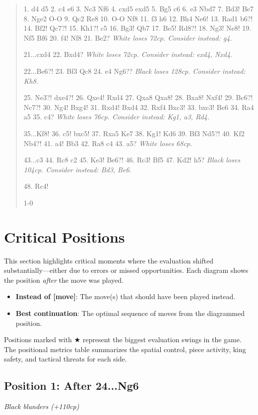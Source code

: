 \documentclass[11pt]{book}
\begin{document}
\begin{quote}
1. d4 d5
2. c4 e6
3. Nc3 Nf6
4. cxd5 exd5
5. Bg5 c6
6. e3 Nbd7
7. Bd3! Be7
8. Nge2 O-O
9. Qc2 Re8
10. O-O Nf8
11. f3 h6
12. Bh4 Ne6!
13. Rad1 b6?!
14. Bf2! Qc7?!
15. Kh1?! c5
16. Bg3! Qb7
17. Be5! Rd8?!
18. Ng3! Ne8!
19. Nf5 Bf6
20. f4! Nf8
21. Be2?
\textit{White loses 72cp. Consider instead: g4.}

21...cxd4
22. Bxd4?
\textit{White loses 72cp. Consider instead: exd4, Nxd4.}

22...Be6?!
23. Bf3 Qc8
24. e4 Ng6??
\textit{Black loses 128cp. Consider instead: Kh8.}

25. Ne3?! dxe4?!
26. Qxe4! Rxd4
27. Qxa8 Qxa8!
28. Bxa8! Nxf4!
29. Bc6?! Nc7?!
30. Ng4! Bxg4!
31. Rxd4! Bxd4
32. Rxf4 Bxc3!
33. bxc3! Be6
34. Ra4 a5
35. c4?
\textit{White loses 76cp. Consider instead: Kg1, a3, Rd4.}

35...Kf8!
36. c5! bxc5!
37. Rxa5 Ke7
38. Kg1! Kd6
39. Bf3 Nd5?!
40. Kf2 Nb4?!
41. a4! Bb3
42. Ra8 c4
43. a5?
\textit{White loses 68cp.}

43...c3
44. Rc8 c2
45. Ke3! Be6?!
46. Rc3! Bf5
47. Kd2! h5?
\textit{Black loses 104cp. Consider instead: Bd3, Be6.}

48. Rc4!

1-0
\end{quote}

\section{Critical Positions}

This section highlights critical moments where the evaluation shifted substantially---either due to errors or missed opportunities. Each diagram shows the position \emph{after} the move was played.

\begin{itemize}
\item \textbf{Instead of [move]}: The move(s) that should have been played instead.
\item \textbf{Best continuation}: The optimal sequence of moves from the diagrammed position.
\end{itemize}

Positions marked with {\color{blue}$\bigstar$} represent the biggest evaluation swings in the game. The positional metrics table summarizes the spatial control, piece activity, king safety, and tactical threats for each side.

\subsection*{Position 1: After 24...Ng6}
\textit{Black blunders (+110cp)}
\end{document}
